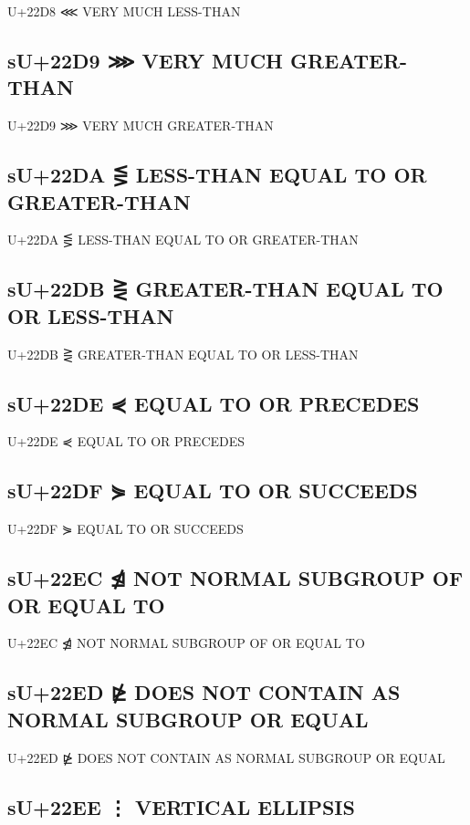 U+22D8 ⋘ VERY MUCH LESS-THAN

\subsection{sU+22D9 ⋙ VERY MUCH GREATER-THAN}

U+22D9 ⋙ VERY MUCH GREATER-THAN

\subsection{sU+22DA ⋚ LESS-THAN EQUAL TO OR GREATER-THAN}

U+22DA ⋚ LESS-THAN EQUAL TO OR GREATER-THAN

\subsection{sU+22DB ⋛ GREATER-THAN EQUAL TO OR LESS-THAN}

U+22DB ⋛ GREATER-THAN EQUAL TO OR LESS-THAN

\subsection{sU+22DE ⋞ EQUAL TO OR PRECEDES}

U+22DE ⋞ EQUAL TO OR PRECEDES

\subsection{sU+22DF ⋟ EQUAL TO OR SUCCEEDS}

U+22DF ⋟ EQUAL TO OR SUCCEEDS

\subsection{sU+22EC ⋬ NOT NORMAL SUBGROUP OF OR EQUAL TO}

U+22EC ⋬ NOT NORMAL SUBGROUP OF OR EQUAL TO

\subsection{sU+22ED ⋭ DOES NOT CONTAIN AS NORMAL SUBGROUP OR EQUAL}

U+22ED ⋭ DOES NOT CONTAIN AS NORMAL SUBGROUP OR EQUAL

\subsection{sU+22EE ⋮ VERTICAL ELLIPSIS}

